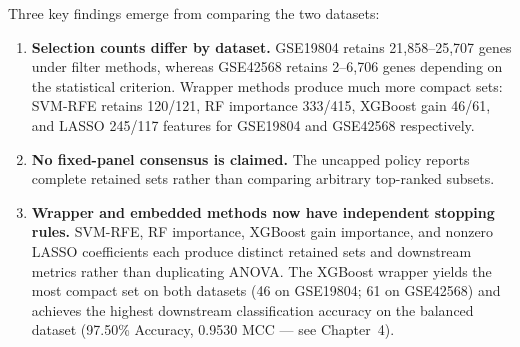 Three key findings emerge from comparing the two datasets:

\begin{enumerate}
    \item \textbf{Selection counts differ by dataset.} GSE19804 retains 21,858--25,707 genes under filter methods, whereas GSE42568 retains 2--6,706 genes depending on the statistical criterion. Wrapper methods produce much more compact sets: SVM-RFE retains 120/121, RF importance 333/415, XGBoost gain 46/61, and LASSO 245/117 features for GSE19804 and GSE42568 respectively.

    \item \textbf{No fixed-panel consensus is claimed.} The uncapped policy reports complete retained sets rather than comparing arbitrary top-ranked subsets.

    \item \textbf{Wrapper and embedded methods now have independent stopping rules.} SVM-RFE, RF importance, XGBoost gain importance, and nonzero LASSO coefficients each produce distinct retained sets and downstream metrics rather than duplicating ANOVA. The XGBoost wrapper yields the most compact set on both datasets (46 on GSE19804; 61 on GSE42568) and achieves the highest downstream classification accuracy on the balanced dataset (97.50\% Accuracy, 0.9530 MCC — see Chapter~4).
\end{enumerate}